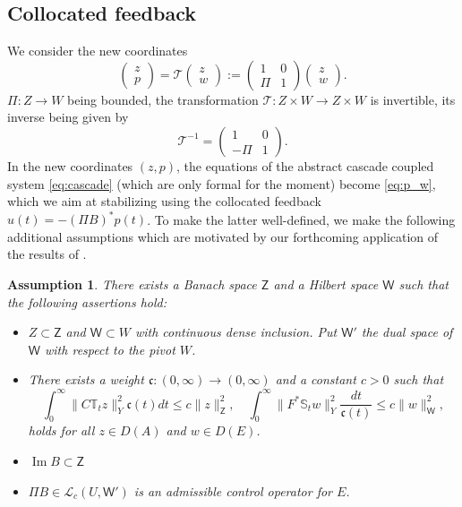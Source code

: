 \documentclass[10pt]{article}
\newcommand{\opIm}{\operatorname{Im}}
\newtheorem{Assumption}[Theorem]{Assumption}
\begin{document}
\subsection{Collocated feedback}\label{sec:colloc}
We consider the new coordinates
\begin{equation}
    \label{eq:change}
\begin{pmatrix}
z\\ p
\end{pmatrix} = \mathcal{T} \begin{pmatrix}
z\\ w
\end{pmatrix} := \begin{pmatrix}
1 & 0\\
\Pi & 1
\end{pmatrix}\begin{pmatrix}
z\\ w
\end{pmatrix}.
\end{equation}
$\Pi : Z \rightarrow W$ being bounded, the transformation $\mathcal{T} : Z \times W \rightarrow Z \times W$ is invertible, its inverse being given by
\[
\mathcal{T}^{-1} = \begin{pmatrix}
1 & 0\\
-\Pi & 1
\end{pmatrix}.
\]
In the new coordinates $(z,p)$, the equations of the abstract cascade coupled system \eqref{eq:cascade} (which are only formal for the moment) become \eqref{eq:p_w}, which we aim at stabilizing using the collocated feedback $u(t) = -(\Pi B)^*p(t)$. To make the latter well-defined, we make the following additional assumptions which are motivated by our forthcoming application of the results of \cite[\S 2.A]{chill}. 
\begin{Assumption}\label{ass:chill}
There exists a Banach space $\mathsf{Z}$ and a Hilbert space $\mathsf{W}$ such that the following assertions hold:
\begin{itemize}
    \item $Z \subset \mathsf{Z}$ and $\mathsf{W} \subset W$ with continuous dense inclusion. Put $\mathsf{W}'$ the dual space of $\mathsf{W}$ with respect to the pivot $W$.
    \item There exists a weight $\mathfrak{c} : (0,\infty) \rightarrow (0,\infty)$ and a constant $c > 0$ such that 
\[
    \int_0^\infty \| C\mathbb T_t z \|_Y^2 \mathfrak{c}(t) dt \leq c \| z \|_{\mathsf{Z}}^2,\quad \int_0^\infty \| F^* \mathbb S_t w \|_Y^2 \frac{dt}{\mathfrak{c}(t)} \leq c \| w \|_{\mathsf{W}}^2,
\]
holds for all $z \in D(A)$ and $w \in D(E)$.
\item $\opIm B \subset \mathsf{Z}$
\item $\Pi B \in \mathcal L_c(U,\mathsf{W}')$ is an admissible control operator for $E$. 
\end{itemize}
\end{Assumption}
\end{document}
